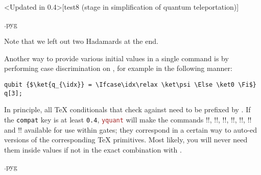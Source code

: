 \documentclass{scrartcl}
\makeatletter
\newenvironment{codeexample}{%
   \VerbatimEnvironment%
   \let\FVB@VerbatimOut\minted@FVB@VerbatimOut
   \let\FVE@VerbatimOut\minted@FVE@VerbatimOut
   \minted@configlang{tex}%
   \minted@fvset
   \begin{VerbatimOut}[codes={\catcode`\^^I=12},firstline,lastline]{\minted@jobname.pyg}%
}{
   \end{VerbatimOut}%
   \minted@langlinenoson%
   \savebox\codeexamplebox{ \minted@jobname.pyg}%
   \ifdim\wd\codeexamplebox>\dimexpr.5\linewidth-3mm\relax%
      \wd\codeexamplebox=.5\linewidth%
   \else%
      \wd\codeexamplebox=\dimexpr\wd\codeexamplebox+3mm\relax%
   \fi%
   \noindent\begin{minipage}{\wd\codeexamplebox}%
      \centering%
      \usebox\codeexamplebox%
   \end{minipage}%
   \begin{minipage}{\dimexpr\linewidth-\wd\codeexamplebox\relax}%
      \expandafter\minted@pygmentize\expandafter{\minted@lang}%
   \end{minipage}%
   \minted@langlinenosoff%
   \par%
}
\def\pkg#1{\textcolor{brown}{\texttt{#1}}}
\def\ttlink{\link\texttt}
\def\texlink{\link\tex}
\def\Yquant{\pkg{yquant}}
\makeatother
\begin{document}
         \clearpage
         \begin{example}<Updated in 0.4>[test8 (stage in simplification of quantum teleportation)]
            \begin{codeexample}
            \end{codeexample}
            Note that we left out two Hadamards at the end.

            Another way to provide various initial values in a single command is by performing case discrimination on \texlink\idx, for example in the following manner:

            \begin{verbatim}
qubit {$\ket{q_{\idx}} = \Ifcase\idx\relax \ket\psi \Else \ket0 \Fi$} q[3];
            \end{verbatim}
            In principle, all \TeX{} conditionals that check against \texlink{\idx} need to be prefixed by \texlink\protect.
            \linkdef\Ifnum\linkdef\Ifcase\linkdef\Or\linkdef\Else\linkdef\Fi\linkdef\Unless\linkdef\The
            If the \ttlink{compat} key is at least \texttt{0.4}, \Yquant{} will make the commands \tex!\Ifnum!, \tex!\Ifcase!, \tex!\Or!, \tex!\Else!, \tex!\Fi!, \tex!\Unless! and \tex!\The! available for use within gates; they correspond in a certain way to auto\hyp\texlink\protect ed versions of the corresponding \TeX{} primitives.
            Most likely, you will never need them inside values if not in the exact combination with \texlink\idx.
         \end{example}

         \clearpage
         \begin{example}
            \begin{codeexample}
            \end{codeexample}
         \end{example}
\end{document}
